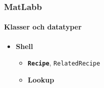 \begin{frame}
  \frametitle{MatLabb}
  \framesubtitle{Klasser och datatyper}
  \begin{itemize}
    \item \textbf{Shell}
      \begin{itemize}
        \item \textbf{\texttt{Recipe}}, \texttt{RelatedRecipe}
        \item \textbf{Lookup}
      \end{itemize}
  \end{itemize}
\end{frame}
